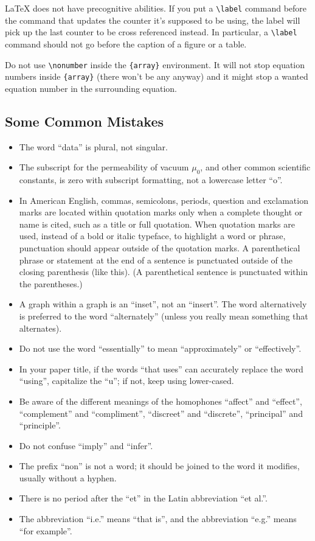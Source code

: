 \documentclass[conference]{IEEEtran}
\begin{document}
{\LaTeX} does not have precognitive abilities. If you put a
\verb|\label| command before the command that updates the counter it's
supposed to be using, the label will pick up the last counter to be
cross referenced instead. In particular, a \verb|\label| command
should not go before the caption of a figure or a table.

Do not use \verb|\nonumber| inside the \verb|{array}| environment. It
will not stop equation numbers inside \verb|{array}| (there won't be
any anyway) and it might stop a wanted equation number in the
surrounding equation.

\subsection{Some Common Mistakes}\label{SCM}
\begin{itemize}
\item The word ``data'' is plural, not singular.
\item The subscript for the permeability of vacuum $\mu_{0}$, and other common scientific constants, is zero with subscript formatting, not a lowercase letter ``o''.
\item In American English, commas, semicolons, periods, question and exclamation marks are located within quotation marks only when a complete thought or name is cited, such as a title or full quotation. When quotation marks are used, instead of a bold or italic typeface, to highlight a word or phrase, punctuation should appear outside of the quotation marks. A parenthetical phrase or statement at the end of a sentence is punctuated outside of the closing parenthesis (like this). (A parenthetical sentence is punctuated within the parentheses.)
\item A graph within a graph is an ``inset'', not an ``insert''. The word alternatively is preferred to the word ``alternately'' (unless you really mean something that alternates).
\item Do not use the word ``essentially'' to mean ``approximately'' or ``effectively''.
\item In your paper title, if the words ``that uses'' can accurately replace the word ``using'', capitalize the ``u''; if not, keep using lower-cased.
\item Be aware of the different meanings of the homophones ``affect'' and ``effect'', ``complement'' and ``compliment'', ``discreet'' and ``discrete'', ``principal'' and ``principle''.
\item Do not confuse ``imply'' and ``infer''.
\item The prefix ``non'' is not a word; it should be joined to the word it modifies, usually without a hyphen.
\item There is no period after the ``et'' in the Latin abbreviation ``et al.''.
\item The abbreviation ``i.e.'' means ``that is'', and the abbreviation ``e.g.'' means ``for example''.
\end{itemize}
\end{document}
